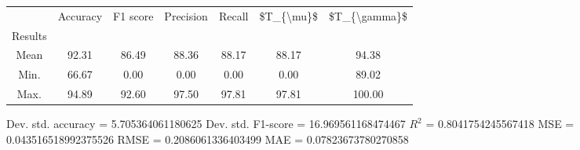 \begin{tabular}{|c|c|c|c|c|c|c|}
\toprule
{} &  Accuracy &  F1 score &  Precision &  Recall &  \$T\_\{\textbackslash mu\}\$ &  \$T\_\{\textbackslash gamma\}\$ \\
Results &           &           &            &         &            &               \\
\hline
Mean    &     92.31 &     86.49 &      88.36 &   88.17 &      88.17 &         94.38 \\
Min.    &     66.67 &      0.00 &       0.00 &    0.00 &       0.00 &         89.02 \\
Max.    &     94.89 &     92.60 &      97.50 &   97.81 &      97.81 &        100.00 \\
\bottomrule
\end{tabular}

 Dev. std. accuracy = 5.705364061180625
 Dev. std. F1-score = 16.969561168474467
 $R^2$ = 0.8041754245567418
 MSE = 0.043516518992375526
 RMSE = 0.2086061336403499
 MAE = 0.07823673780270858